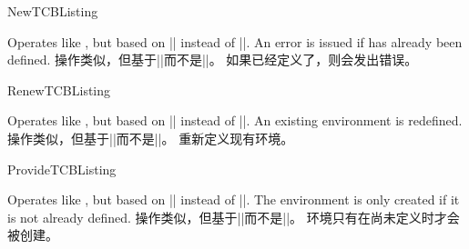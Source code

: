 \begin{docCommand}{NewTCBListing}{}
\begin{stripedbox}
Operates like , but based on |\NewDocumentEnvironment| instead of |\DeclareDocumentEnvironment|.
An error is issued if  has already been defined.
\tcblower
操作类似，但基于|\NewDocumentEnvironment|而不是|\DeclareDocumentEnvironment|。
如果已经定义了，则会发出错误。
\end{stripedbox}
\end{docCommand}

\begin{docCommand}{RenewTCBListing}{}
\begin{stripedbox}
Operates like , but based on |\RenewDocumentEnvironment| instead of |\DeclareDocumentEnvironment|.
An existing environment is redefined.
\tcblower
操作类似，但基于|\RenewDocumentEnvironment|而不是|\DeclareDocumentEnvironment|。
重新定义现有环境。
\end{stripedbox}
\end{docCommand}

\begin{docCommand}{ProvideTCBListing}{}
\begin{stripedbox}
Operates like , but based on |\ProvideDocumentEnvironment| instead of |\DeclareDocumentEnvironment|.
The environment  is only created if it is not already defined.
\tcblower
操作类似，但基于|\ProvideDocumentEnvironment|而不是|\DeclareDocumentEnvironment|。
环境只有在尚未定义时才会被创建。
\end{stripedbox}    
\end{docCommand}

